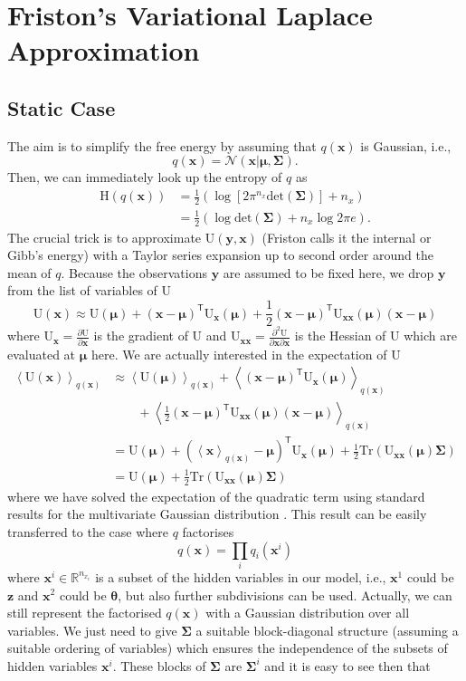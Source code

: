 \documentclass[a4paper,10pt]{article}
\newcommand{\bs}[1]{\mathbf{#1}}					%
\newcommand{\bgs}[1]{\boldsymbol{#1}}				%
\newcommand{\pd}[2]{\frac{\partial #1}{\partial #2}} 	%
\newcommand{\ppd}[3]{\frac{\partial^2 #1}{\partial #2 \partial #3}} %
\newcommand{\tr}{\mathsf{T}}				%
\newcommand{\eq}[1]{\begin{equation} #1 \end{equation}}%
\newcommand{\trace}[1]{\mathrm{Tr}\left(#1\right)}					%
\renewcommand{\ss}{z}         %
\newcommand{\so}{y}         %
\newcommand{\sh}{x}         %
\renewcommand{\sp}{\theta}    %
\newcommand{\ps}{\bs{\ss}}    %
\newcommand{\po}{\bs{\so}}    %
\newcommand{\ph}{\bs{\sh}}    %
\newcommand{\pp}{\bgs{\sp}} %
\newcommand{\E}[2][]{\left\langle #2 \right\rangle_{#1}}	%
\newcommand{\Ent}{\mathrm{H}}			%
\newcommand{\U}{\mathrm{U}}			%
\newcommand{\N}{\mathcal{N}}			%
\newcommand{\R}{\mathbb{R}}				%
\newcommand{\Cov}{\bgs{\Sigma}}			%
\renewcommand{\det}[1]{\mathrm{det}(#1)}	%
\begin{document}
\section{Friston's Variational Laplace Approximation}
\subsection{Static Case}
The aim is to simplify the free energy by assuming that $q(\ph)$ is Gaussian, i.e.,
\eq{
    q(\ph) = \N(\ph|\bgs{\mu},\Cov).
}
Then, we can immediately look up the entropy of $q$ \citep[][eq. (366)]{Petersen2008} as
\eq{\begin{split}
    \Ent(q(\ph)) &= \frac{1}{2} \left(\log [2\pi^{n_\sh} \det{\Cov}] + n_\sh\right) \\
                 &= \frac{1}{2} \left(\log \det{\Cov} + n_\sh \log 2\pi e\right).
\end{split}}
The crucial trick is to approximate $\U(\po,\ph)$ (Friston calls it the internal or Gibb's energy) with a Taylor series expansion up to second order around the mean of $q$. Because the observations $\po$ are assumed to be fixed here, we drop $\po$ from the list of variables of $\U$
\eq{
    \U(\ph) \approx \U(\bgs{\mu}) + (\ph - \bgs{\mu})^\tr \U_\ph(\bgs{\mu}) + \frac{1}{2}(\ph - \bgs{\mu})^\tr \U_{\ph\ph}(\bgs{\mu}) (\ph - \bgs{\mu})
}
where $\U_\ph = \pd{\U}{\ph}$ is the gradient of $\U$ and $\U_{\ph\ph} = \ppd{\U}{\ph}{\ph}$ is the Hessian of $\U$ which are evaluated at $\bgs{\mu}$ here. We are actually interested in the expectation of $\U$
\begin{align}
    \E[q(\ph)]{\U(\ph)} &\approx 
            \E[q(\ph)]{\U(\bgs{\mu})} + \E[q(\ph)]{(\ph - \bgs{\mu})^\tr \U_\ph(\bgs{\mu})}\nonumber\\
               & \qquad + \E[q(\ph)]{\frac{1}{2}(\ph - \bgs{\mu})^\tr \U_{\ph\ph}(\bgs{\mu}) (\ph - \bgs{\mu})}\\
        &= \U(\bgs{\mu}) + \left(\E[q(\ph)]{\ph} - \bgs{\mu}\right)^\tr \U_\ph(\bgs{\mu}) + \frac{1}{2}\trace{\U_{\ph\ph}(\bgs{\mu})\Cov}\\
        &= \U(\bgs{\mu}) + \frac{1}{2}\trace{\U_{\ph\ph}(\bgs{\mu})\Cov}
\end{align}
where we have solved the expectation of the quadratic term using standard results for the multivariate Gaussian distribution \citep[][eq. (357)]{Petersen2008}. This result can be easily transferred to the case where $q$ factorises
\eq{
    q(\ph) = \prod_i q_i(\ph^i)
}
where $\ph^i \in \R^{n_{\sh_i}}$ is a subset of the hidden variables in our model, i.e., $\ph^1$ could be $\ps$ and $\ph^2$ could be $\pp$, but also further subdivisions can be used. Actually, we can still represent the factorised $q(\ph)$ with a Gaussian distribution over all variables. We just need to give $\Cov$ a suitable block-diagonal structure (assuming a suitable ordering of variables) which ensures the independence of the subsets of hidden variables $\ph^i$. These blocks of $\Cov$ are $\Cov^i$ and it is easy to see then that
\end{document}
